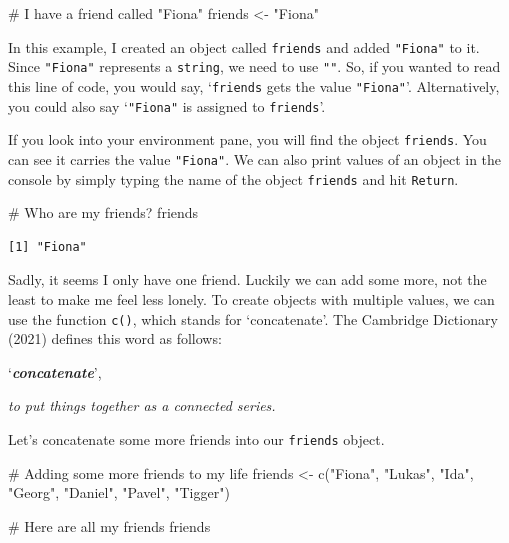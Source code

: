 \documentclass[
  letterpaper,
]{krantz}
\makeatletter
\newenvironment{Shaded}{\begin{snugshade}}{\end{snugshade}}
\newcommand{\CommentTok}[1]{\textcolor[rgb]{0.37,0.37,0.37}{#1}}
\newcommand{\FunctionTok}[1]{\textcolor[rgb]{0.28,0.35,0.67}{#1}}
\newcommand{\NormalTok}[1]{\textcolor[rgb]{0.00,0.23,0.31}{#1}}
\newcommand{\OtherTok}[1]{\textcolor[rgb]{0.00,0.23,0.31}{#1}}
\newcommand{\StringTok}[1]{\textcolor[rgb]{0.13,0.47,0.30}{#1}}
\renewenvironment{quote}{\begin{VF}}{\end{VF}}
\newenvironment{kframe}{%
\medskip{}
\setlength{\fboxsep}{.8em}
 \def\at@end@of@kframe{}%
 \ifinner\ifhmode%
  \def\at@end@of@kframe{\end{minipage}}%
  \begin{minipage}{\columnwidth}%
 \fi\fi%
 \def\FrameCommand##1{\hskip\@totalleftmargin \hskip-\fboxsep
 \colorbox{shadecolor}{##1}\hskip-\fboxsep
     \hskip-\linewidth \hskip-\@totalleftmargin \hskip\columnwidth}%
 \MakeFramed {\advance\hsize-\width
   \@totalleftmargin\z@ \linewidth\hsize
   \@setminipage}}%
 {\par\unskip\endMakeFramed%
 \at@end@of@kframe}
\renewenvironment{Shaded}{\begin{kframe}}{\end{kframe}}
\makeatother
\begin{document}
\begin{Shaded}
\begin{Highlighting}[]
\CommentTok{\# I have a friend called "Fiona"}
\NormalTok{friends }\OtherTok{\textless{}{-}} \StringTok{"Fiona"}
\end{Highlighting}
\end{Shaded}

In this example, I created an object called \texttt{friends} and added
\texttt{"Fiona"} to it. Since \texttt{"Fiona"} represents a
\texttt{string}, we need to use \texttt{""}. So, if you wanted to read
this line of code, you would say, `\texttt{friends} gets the value
\texttt{"Fiona"}'. Alternatively, you could also say `\texttt{"Fiona"}
is assigned to \texttt{friends}'.

If you look into your environment pane, you will find the object
\texttt{friends}. You can see it carries the value \texttt{"Fiona"}. We
can also print values of an object in the console by simply typing the
name of the object \texttt{friends} and hit \texttt{Return}.

\begin{Shaded}
\begin{Highlighting}[]
\CommentTok{\# Who are my friends?}
\NormalTok{friends}
\end{Highlighting}
\end{Shaded}

\begin{verbatim}
[1] "Fiona"
\end{verbatim}

Sadly, it seems I only have one friend. Luckily we can add some more,
not the least to make me feel less lonely. To create objects with
multiple values, we can use the function \texttt{c()}, which stands for
`concatenate'. The Cambridge Dictionary (2021) defines this word as
follows:

\begin{quote}
`\textbf{\emph{concatenate}}',

\emph{to put things together as a connected series.}
\end{quote}

Let's concatenate some more friends into our \texttt{friends} object.

\begin{Shaded}
\begin{Highlighting}[]
\CommentTok{\# Adding some more friends to my life}
\NormalTok{friends }\OtherTok{\textless{}{-}} \FunctionTok{c}\NormalTok{(}\StringTok{"Fiona"}\NormalTok{,}
             \StringTok{"Lukas"}\NormalTok{,}
             \StringTok{"Ida"}\NormalTok{,}
             \StringTok{"Georg"}\NormalTok{,}
             \StringTok{"Daniel"}\NormalTok{,}
             \StringTok{"Pavel"}\NormalTok{,}
             \StringTok{"Tigger"}\NormalTok{)}

\CommentTok{\# Here are all my friends}
\NormalTok{friends}
\end{Highlighting}
\end{Shaded}
\end{document}
